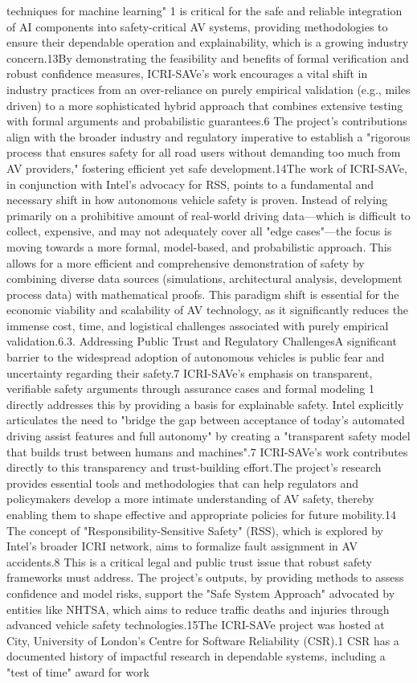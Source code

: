 techniques for machine learning" 1 is critical for the safe and reliable integration of AI components into safety-critical AV systems, providing methodologies to ensure their dependable operation and explainability, which is a growing industry concern.13By demonstrating the feasibility and benefits of formal verification and robust confidence measures, ICRI-SAVe's work encourages a vital shift in industry practices from an over-reliance on purely empirical validation (e.g., miles driven) to a more sophisticated hybrid approach that combines extensive testing with formal arguments and probabilistic guarantees.6 The project's contributions align with the broader industry and regulatory imperative to establish a "rigorous process that ensures safety for all road users without demanding too much from AV providers," fostering efficient yet safe development.14The work of ICRI-SAVe, in conjunction with Intel's advocacy for RSS, points to a fundamental and necessary shift in how autonomous vehicle safety is proven. Instead of relying primarily on a prohibitive amount of real-world driving data—which is difficult to collect, expensive, and may not adequately cover all "edge cases"—the focus is moving towards a more formal, model-based, and probabilistic approach. This allows for a more efficient and comprehensive demonstration of safety by combining diverse data sources (simulations, architectural analysis, development process data) with mathematical proofs. This paradigm shift is essential for the economic viability and scalability of AV technology, as it significantly reduces the immense cost, time, and logistical challenges associated with purely empirical validation.6.3. Addressing Public Trust and Regulatory ChallengesA significant barrier to the widespread adoption of autonomous vehicles is public fear and uncertainty regarding their safety.7 ICRI-SAVe's emphasis on transparent, verifiable safety arguments through assurance cases and formal modeling 1 directly addresses this by providing a basis for explainable safety. Intel explicitly articulates the need to "bridge the gap between acceptance of today's automated driving assist features and full autonomy" by creating a "transparent safety model that builds trust between humans and machines".7 ICRI-SAVe's work contributes directly to this transparency and trust-building effort.The project's research provides essential tools and methodologies that can help regulators and policymakers develop a more intimate understanding of AV safety, thereby enabling them to shape effective and appropriate policies for future mobility.14 The concept of "Responsibility-Sensitive Safety" (RSS), which is explored by Intel's broader ICRI network, aims to formalize fault assignment in AV accidents.8 This is a critical legal and public trust issue that robust safety frameworks must address. The project's outputs, by providing methods to assess confidence and model risks, support the "Safe System Approach" advocated by entities like NHTSA, which aims to reduce traffic deaths and injuries through advanced vehicle safety technologies.15The ICRI-SAVe project was hosted at City, University of London's Centre for Software Reliability (CSR).1 CSR has a documented history of impactful research in dependable systems, including a "test of time" award for work 